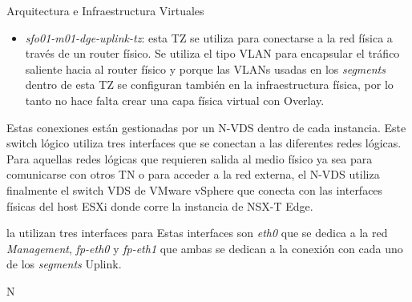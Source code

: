 \begin{subsection}{Arquitectura e Infraestructura Virtuales\cite{CFVirtInfraes}}
\begin{itemize}
  \item \textit{sfo01-m01-dge-uplink-tz}: esta TZ se utiliza para conectarse a la red física a través de un router físico. Se utiliza el tipo VLAN para encapsular el tráfico saliente hacia al router físico y porque las VLANs usadas en los \textit{segments} dentro de esta TZ se configuran también en la infraestructura física, por lo tanto no hace falta crear una capa física virtual con Overlay.
\end{itemize}

Estas conexiones están gestionadas por un N-VDS dentro de cada instancia. Este switch lógico utiliza tres interfaces que se conectan a las diferentes redes lógicas. Para aquellas redes lógicas que requieren salida al medio físico ya sea para comunicarse con otros TN o para acceder a la red externa, el N-VDS utiliza finalmente el switch VDS de VMware vSphere que conecta con las interfaces físicas del host ESXi donde corre la instancia de NSX-T Edge.

la utilizan tres interfaces para  Estas interfaces son \textit{eth0} que se dedica a la red \textit{Management}, \textit{fp-eth0} y \textit{fp-eth1} que ambas se dedican a la conexión con cada uno de los \textit{segments} Uplink. 





N


\end{subsection}

